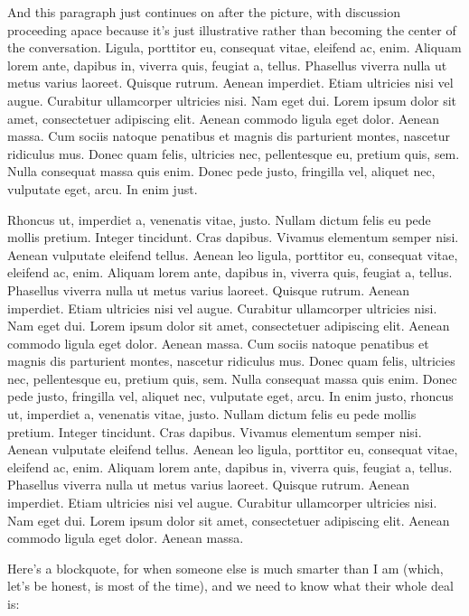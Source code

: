 \documentclass[
    12pt,
    letterpaper,
    oneside,
    noraggedright
]{turabian-researchpaper}
\begin{document}
\noindent{}And this paragraph just continues on after the picture, with
discussion proceeding apace because it's just illustrative rather than
becoming the center of the conversation. Ligula, porttitor eu, consequat
vitae, eleifend ac, enim. Aliquam lorem ante, dapibus in, viverra quis,
feugiat a, tellus. Phasellus viverra nulla ut metus varius laoreet.
Quisque rutrum. Aenean imperdiet. Etiam ultricies nisi vel augue.
Curabitur ullamcorper ultricies nisi. Nam eget dui. Lorem ipsum dolor
sit amet, consectetuer adipiscing elit. Aenean commodo ligula eget
dolor. Aenean massa. Cum sociis natoque penatibus et magnis dis
parturient montes, nascetur ridiculus mus. Donec quam felis, ultricies
nec, pellentesque eu, pretium quis, sem. Nulla consequat massa quis
enim. Donec pede justo, fringilla vel, aliquet nec, vulputate eget,
arcu. In enim just.

Rhoncus ut, imperdiet a, venenatis vitae, justo. Nullam dictum felis eu
pede mollis pretium. Integer tincidunt. Cras dapibus. Vivamus elementum
semper nisi. Aenean vulputate eleifend tellus. Aenean leo ligula,
porttitor eu, consequat vitae, eleifend ac, enim. Aliquam lorem ante,
dapibus in, viverra quis, feugiat a, tellus. Phasellus viverra nulla ut
metus varius laoreet. Quisque rutrum. Aenean imperdiet. Etiam ultricies
nisi vel augue. Curabitur ullamcorper ultricies nisi. Nam eget dui.
Lorem ipsum dolor sit amet, consectetuer adipiscing elit. Aenean commodo
ligula eget dolor. Aenean massa. Cum sociis natoque penatibus et magnis
dis parturient montes, nascetur ridiculus mus. Donec quam felis,
ultricies nec, pellentesque eu, pretium quis, sem. Nulla consequat massa
quis enim. Donec pede justo, fringilla vel, aliquet nec, vulputate eget,
arcu. In enim justo, rhoncus ut, imperdiet a, venenatis vitae, justo.
Nullam dictum felis eu pede mollis pretium. Integer tincidunt. Cras
dapibus. Vivamus elementum semper nisi. Aenean vulputate eleifend
tellus. Aenean leo ligula, porttitor eu, consequat vitae, eleifend ac,
enim. Aliquam lorem ante, dapibus in, viverra quis, feugiat a, tellus.
Phasellus viverra nulla ut metus varius laoreet. Quisque rutrum. Aenean
imperdiet. Etiam ultricies nisi vel augue. Curabitur ullamcorper
ultricies nisi. Nam eget dui. Lorem ipsum dolor sit amet, consectetuer
adipiscing elit. Aenean commodo ligula eget dolor. Aenean massa.

Here's a blockquote, for when someone else is much smarter than I am
(which, let's be honest, is most of the time), and we need to know what
their whole deal is:
\end{document}
